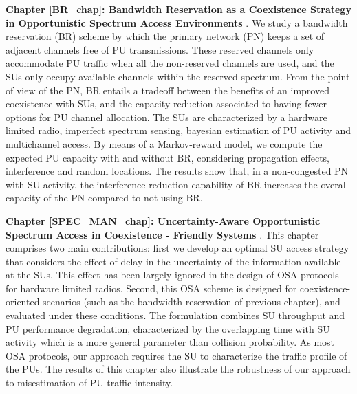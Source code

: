 \textbf{Chapter \ref{BR_chap}: Bandwidth Reservation as a Coexistence Strategy in Opportunistic Spectrum Access Environments} \cite{ref:Alcaraz2014_BR}. We study a bandwidth reservation (BR) scheme by which the primary network (PN) keeps a set of adjacent channels free of PU transmissions. 
These reserved channels only accommodate PU traffic when all the non-reserved channels are used, and the SUs only occupy available channels within the reserved spectrum.
From the point of view of the PN, BR entails a tradeoff between the benefits of an improved coexistence with SUs, and the capacity reduction associated to having fewer options for PU channel allocation.
The SUs are characterized by a hardware limited radio, imperfect spectrum sensing, bayesian estimation of PU activity and multichannel access. 
By means of a Markov-reward model, we compute the expected PU capacity with and without BR, considering propagation effects, interference and random locations.
The results show that, in a non-congested PN with SU activity, the interference reduction capability of BR increases the overall capacity of the PN compared to not using BR.

\textbf{Chapter \ref{SPEC_MAN_chap}: Uncertainty-Aware Opportunistic Spectrum Access in Coexistence - Friendly Systems} \cite{ref:Alcaraz2015_SPEC_MAN}.
This chapter comprises two main contributions: first we develop an optimal SU access strategy that considers the effect of delay in the uncertainty of the information available at the SUs. This effect has been largely ignored in the design of OSA protocols for hardware limited radios. Second, this OSA scheme is designed for coexistence-oriented scenarios (such as the bandwidth reservation of previous chapter), and evaluated under these conditions.
The formulation combines SU throughput and PU performance degradation, characterized by the overlapping time with SU activity which is a more general parameter than collision probability.    
As most OSA protocols, our approach requires the SU to characterize the traffic profile of the PUs. The results of this chapter also illustrate the robustness of our approach to misestimation of PU traffic intensity.

